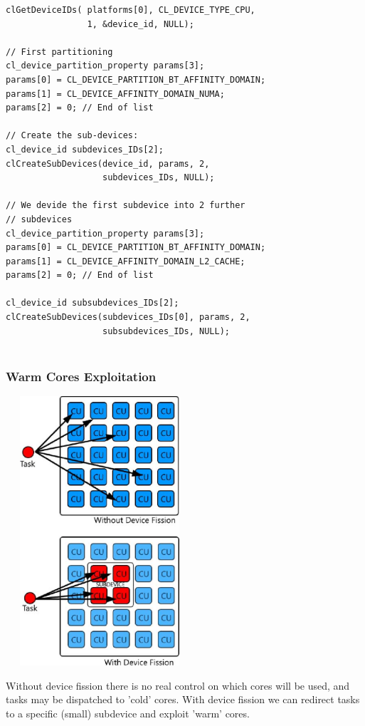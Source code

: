 {\footnotesize\begin{verbatim}
clGetDeviceIDs( platforms[0], CL_DEVICE_TYPE_CPU,
                1, &device_id, NULL);

// First partitioning
cl_device_partition_property params[3];
params[0] = CL_DEVICE_PARTITION_BT_AFFINITY_DOMAIN;
params[1] = CL_DEVICE_AFFINITY_DOMAIN_NUMA; 
params[2] = 0; // End of list

// Create the sub-devices:
cl_device_id subdevices_IDs[2];
clCreateSubDevices(device_id, params, 2,
                   subdevices_IDs, NULL);
									
// We devide the first subdevice into 2 further
// subdevices
cl_device_partition_property params[3];
params[0] = CL_DEVICE_PARTITION_BT_AFFINITY_DOMAIN;
params[1] = CL_DEVICE_AFFINITY_DOMAIN_L2_CACHE; 
params[2] = 0; // End of list

cl_device_id subsubdevices_IDs[2];
clCreateSubDevices(subdevices_IDs[0], params, 2,
                   subsubdevices_IDs, NULL);


\end{verbatim}}
\vfill
\columnbreak

\subsubsection{Warm Cores Exploitation}

\begin{figurehere}
 \centering
 \includegraphics[width=7cm, height=10cm]{./eps/WarmCores.eps}
 \caption{Without device fission there is no real control on which cores will be used, and tasks may be dispatched to 'cold' cores. With device fission we can redirect tasks to a specific (small) subdevice and exploit 'warm' cores.}
 \label{fig:WarmCores}
\end{figurehere}

